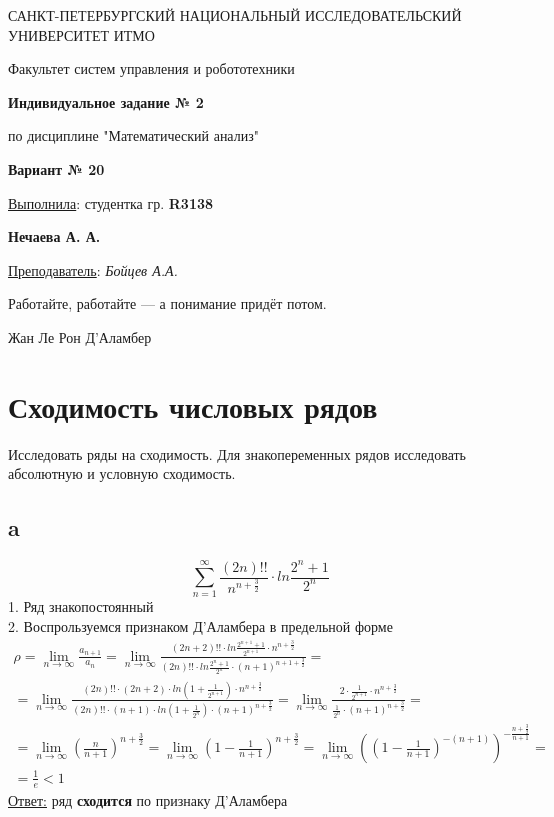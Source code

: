 \documentclass[a5paper, 10pt]{article}
\theoremstyle{definition}
\theoremstyle{plain}
\theoremstyle{remark}
\newcommand*{\titlePage}{
	\thispagestyle{title}
	\begingroup
	\begin{center}
		\vspace*{6ex}
		
		{\small
			САНКТ-ПЕТЕРБУРГСКИЙ НАЦИОНАЛЬНЫЙ ИССЛЕДОВАТЕЛЬСКИЙ УНИВЕРСИТЕТ ИТМО
		}
		
		\vspace*{2ex}
		
		{\normalsize
			Факультет систем управления и робототехники
		}
		
		\vspace*{15ex}
		
		{\Large \bfseries 
			Индивидуальное задание № 2
		}

\vspace*{2ex}
		
		{\normalsize
			по дисциплине "Математический анализ"
		}
\vspace*{5ex}
		
		{\Large \bfseries 
			 Вариант № 20
		}
	\end{center}
	\vspace*{20ex}
	\begin{flushright}
		{\large 
			\underline{Выполнила}: студентка гр. \textbf{R3138}\\
			\begin{flushright}
				\textbf{Нечаева А. А.}\\
			\end{flushright}
		}
		
		\vspace*{5ex}
		
		{\large 
			\underline{Преподаватель}: \textit{Бойцев А.А.}
		}
	\end{flushright}	
	\newpage
	\setcounter{page}{2}
	\endgroup}
\begin{document}
	\titlePage
	\pagestyle{style}
\newpage

\epigraph{Работайте, работайте — а понимание придёт потом.}{Жан Ле Рон Д’Аламбер}
\section{ Сходимость числовых рядов}
Исследовать ряды на сходимость. Для знакопеременных рядов исследовать абсолютную и условную сходимость.	

\subsection{a}
\begin{equation}
\sum \limits_{n = 1}^{\infty} \frac{\left(2n\right)!!}{n^{n+\frac{3}{2}}} \cdot ln \frac{2^n+1}{2^n}
\end{equation}
1. Ряд знакопостоянный\\
2. Воспрользуемся признаком Д'Аламбера в предельной форме
\begin{multline*}
\rho = \lim_{n \to \infty} \frac{a_{n+1}}{a_n} = \lim_{n \to \infty} \frac{\left(2n+2\right)!! \cdot ln\frac{2^{n+1}+1}{2^{n+1}}\cdot n^{n+\frac{3}{2}}}{\left(2n\right)!! \cdot ln\frac{2^{n}+1}{2^{n}}\cdot (n+1)^{n + 1+\frac{3}{2}}} =\\
=  \lim_{n \to \infty} \frac{\left(2n\right)!!\cdot \left(2n+2\right) \cdot ln\left(1 + \frac{1}{2^{n+1}}\right)\cdot n^{n+\frac{3}{2}}}{\left(2n\right)!! \cdot (n+1)\cdot ln\left(1 + \frac{1}{2^{n}}\right)\cdot (n+1)^{n + \frac{3}{2}}} =
 \lim_{n \to \infty} \frac{ 2\cdot  \frac{1}{2^{n+1}}\cdot n^{n+\frac{3}{2}}}{ \frac{1}{2^{n}}\cdot (n+1)^{n + \frac{3}{2}}}=\\ =\lim_{n \to \infty} \left(\frac{n}{n+1} \right)^{n+\frac{3}{2}}= \lim_{n \to \infty} \left(1 - \frac{1}{n+1} \right)^{n+\frac{3}{2}}=\lim_{n \to \infty}  \left( \left(1 - \frac{1}{n+1} \right)^{-(n+1) } \right)^{-\frac{n+\frac{3}{2}}{n+1} }=\\
= \frac{1}{e} < 1
\end{multline*}
\underline{Ответ:} ряд  \textbf{сходится}  по признаку  Д'Аламбера


\newpage
\end{document}
